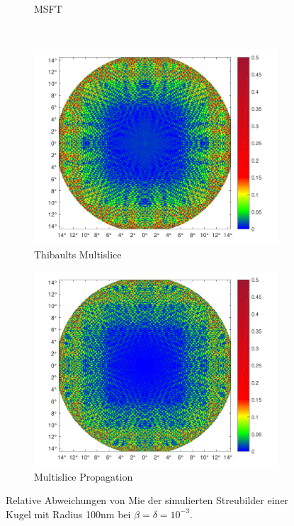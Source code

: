 \begin{figure}
\begin{subfigure}[b]{0.45\textwidth}
		\caption{MSFT}
	\end{subfigure}
	\\
	\begin{subfigure}[b]{0.45\textwidth}
		\includegraphics[width=\textwidth]{images/fig_sim_relerror_thibault-r100-bd1e-3.pdf}
		\caption{Thibaults Multislice}
	\end{subfigure}
	\begin{subfigure}[b]{0.45\textwidth}
		\includegraphics[width=\textwidth]{images/fig_sim_relerror_multislice-r100-bd1e-3.pdf}
		\caption{Multislice Propagation}
	\end{subfigure}
	
	\caption[relativer Fehler der Simulationen]{Relative Abweichungen von Mie der simulierten Streubilder einer Kugel mit Radius 100\si{nm} bei $\beta=\delta=10^{-3}$. }
	\label{fig:var}
\end{figure}


